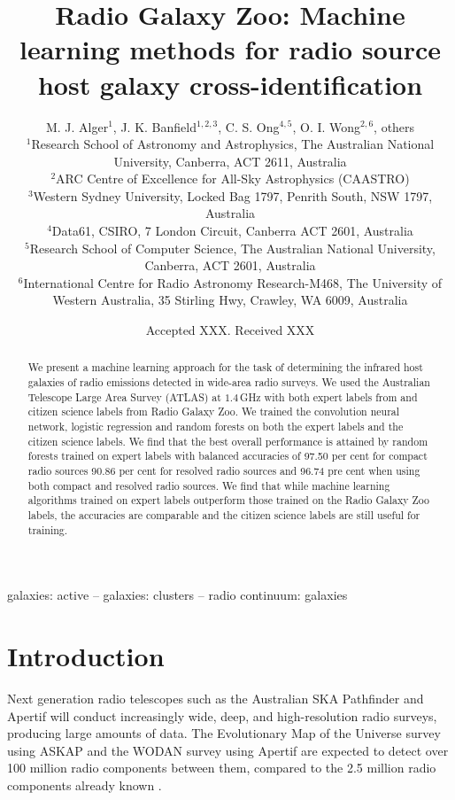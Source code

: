 \documentclass[fleqn,usenatbib,usedcolumn]{mnras}
\title[Machine learning methods for radio source cross-identification]{Radio Galaxy Zoo: Machine learning methods for radio source host galaxy cross-identification}
\author[Alger et al.]{M. J. Alger$^{1}$, J. K. Banfield$^{1, 2, 3}$, C. S. Ong$^{4, 5}$, O. I. Wong$^{2, 6}$, others
\\
$^{1}$Research School of Astronomy and Astrophysics, The Australian National University, Canberra, ACT 2611, Australia\\
$^{2}$ARC Centre of Excellence for All-Sky Astrophysics (CAASTRO)\\
$^{3}$Western Sydney University, Locked Bag 1797, Penrith South, NSW 1797, Australia\\
$^{4}$Data61, CSIRO, 7 London Circuit, Canberra ACT 2601, Australia\\
$^{5}$Research School of Computer Science, The Australian National University, Canberra, ACT 2601, Australia\\
$^{6}$International Centre for Radio Astronomy Research-M468, The University of Western Australia, 35 Stirling Hwy, Crawley, WA 6009, Australia
}
\date{Accepted XXX. Received XXX}
\begin{document}
\label{firstpage}
\pagerange{\pageref{firstpage}--\pageref{lastpage}}
\maketitle

\begin{abstract}
  We present a machine learning approach for the task of determining the
  infrared host galaxies of radio emissions detected in wide-area radio surveys.
  We used the Australian Telescope Large Area Survey (ATLAS) at $1.4\,$GHz with both expert labels from \citet{norris06} and citizen science labels from Radio Galaxy Zoo. We trained the convolution neural network, logistic regression and random forests on both the expert labels and the citizen science labels. We find that the
  best overall performance is attained by random forests trained on expert
  labels with balanced accuracies of 97.50 per cent for compact radio sources 90.86 per cent for resolved radio sources and 96.74 pre cent when using both compact and resolved radio sources. 
  We find that while machine learning algorithms trained on expert
  labels outperform those trained on the Radio Galaxy Zoo labels,
  the accuracies are comparable and the citizen science labels are still useful for
  training. 
    \end{abstract}

\begin{keywords}
galaxies: active -- galaxies: clusters -- radio continuum: galaxies
\end{keywords}


\section{Introduction}\label{introduction}

  Next generation radio telescopes such as the Australian SKA Pathfinder
  \citep[ASKAP;][]{johnston07} and Apertif \citep{verheijen08} will conduct
  increasingly wide, deep, and high-resolution radio surveys, producing large
  amounts of data. The Evolutionary Map of the Universe survey
  \citep[EMU;][]{norris11} using ASKAP and the WODAN survey \citep{rottgering11}
  using Apertif are expected to detect over 100 million radio components between
  them, compared to the 2.5 million radio components already known
  \citep{banfield15}.
\end{document}
